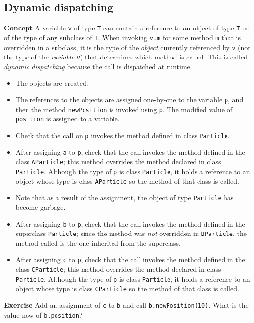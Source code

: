 \subsection{Dynamic dispatching}\label{inher.03}

\textbf{Concept} A variable \texttt{v} of type \texttt{T} can contain a 
reference to an object of type \texttt{T} or of the type of any subclass of 
\texttt{T}. When invoking \texttt{v.m} for some method \texttt{m} that is 
overridden in a subclass, it is the type of the \emph{object} currently 
referenced by \texttt{v} (not the type of the \emph{variable} \texttt{v}) that determines which method is called. This is 
called \emph{dynamic dispatching} because the call is dispatched at 
runtime.


\begin{itemize}
\item The objects are created.
  \item The references to the objects are assigned one-by-one to the variable \texttt{p},
  and then the method \texttt{newPosition} is invoked using \texttt{p}. The modified
  value of \texttt{position} is assigned to a variable.
  \item Check that the call on \texttt{p} invokes the method defined in class 
  \texttt{Particle}.
  \item After assigning \texttt{a} to \texttt{p}, check that the call invokes the
   method defined in the class \texttt{AParticle}; this method overrides the method declared 
  in class \texttt{Particle}. Although the type of \texttt{p} is class
  \texttt{Particle}, it holds a reference to an object whose type is  
  class \texttt{AParticle} so the method of that class is called.
  \item Note that as a result of the assignment, the object of type \texttt{Particle}
  has become garbage.
  \item After assigning \texttt{b} to \texttt{p}, check that the call invokes the
   method defined in the superclass \texttt{Particle}; since the method was \emph{not}
   overridden   in \texttt{BParticle}, the method called is the one inherited from the
   superclass.
  \item After assigning \texttt{c} to \texttt{p}, check that the call invokes the
   method defined in the class \texttt{CParticle}; this method overrides the method declared 
  in class \texttt{Particle}. Although the type of \texttt{p} is class
  \texttt{Particle}, it holds a reference to an object whose type is
  class \texttt{CParticle} so the method of that class is called.
  \end{itemize}

\textbf{Exercise} Add an assignment of \texttt{c} to \texttt{b} and call
\texttt{b.newPosition(10)}. What is the value now of \texttt{b.position}?
